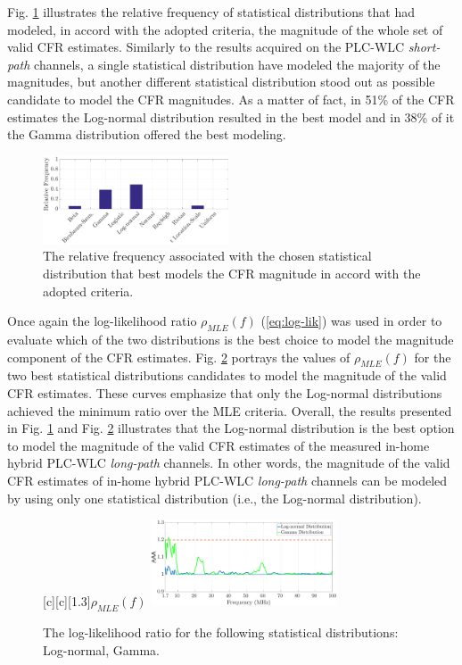 \documentclass[journal]{IEEEtran}
\begin{document}
Fig. \ref{MAG_percentlW} illustrates the relative frequency of statistical distributions that had modeled, in accord with the adopted criteria, the magnitude of the whole set of valid \ac{CFR} estimates. Similarly to the results acquired on the \ac{PLC}-\ac{WLC} \textit{short-path} channels, a single statistical distribution have modeled the majority of the magnitudes, but another different statistical distribution stood out as possible candidate to model the \ac{CFR} magnitudes. As a matter of fact, in 51\% of the \ac{CFR} estimates the Log-normal distribution resulted in the best model and in 38\% of it the Gamma distribution offered the best modeling. 

\begin{figure}[h!]
	\centering
	\includegraphics[width=0.49\textwidth]{images/Mag_percentlW.eps}
	\caption{The relative frequency associated with the chosen statistical distribution that best models the CFR magnitude in accord with the adopted criteria.}
	\label{MAG_percentlW}
\end{figure}

Once again the log-likelihood ratio $\rho_{MLE} (f)$ (\ref{eq:log-lik}) was used in order to evaluate which of the two distributions is the best choice to model the magnitude component of the \ac{CFR} estimates. Fig. \ref{fig:Log_likelW} portrays the values of  $\rho_{MLE}(f)$ for the two best statistical distributions candidates to model the magnitude of the valid \ac{CFR} estimates. These curves emphasize that only the Log-normal distributions achieved the minimum ratio over the \ac{MLE} criteria. Overall, the results presented in Fig. \ref{MAG_percentlW} and Fig. \ref{fig:Log_likelW} illustrates that the Log-normal distribution is the best option to model the magnitude of the valid \ac{CFR} estimates of the measured in-home hybrid \ac{PLC}-\ac{WLC} \textit{long-path} channels. In other words, the magnitude of the valid \ac{CFR} estimates of in-home hybrid \ac{PLC}-\ac{WLC} \textit{long-path} channels can be modeled by using only one statistical distribution (i.e., the Log-normal distribution).

\begin{figure}[h!]
	\centering
	[c][1.3]{$\rho_{MLE} (f)$}
	\includegraphics[width=0.49\textwidth]{images/Log_Lognormal_GammalW.eps}
	\caption{The log-likelihood ratio for the following statistical distributions: Log-normal, Gamma.}
	\label{fig:Log_likelW}
\end{figure}
\end{document}

